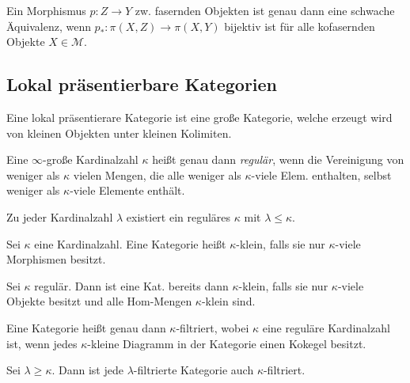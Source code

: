\documentclass{cheat-sheet}
\newcommand{\ModC}{\mathcal{M}} %
\begin{document}
\begin{thm}
  Ein Morphismus $p : Z \to Y$ zw. fasernden Objekten ist genau dann eine schwache Äquivalenz, wenn $p_* : \pi(X, Z) \to \pi(X, Y)$ bijektiv ist für alle kofasernden Objekte $X \in \ModC$.
\end{thm}

\subsection{Lokal präsentierbare Kategorien}


\begin{motto}
  Eine lokal präsentierare Kategorie ist eine große Kategorie, welche erzeugt wird von kleinen Objekten unter kleinen Kolimiten.
\end{motto}

\begin{defn}
  Eine $\infty$-große Kardinalzahl $\kappa$ heißt genau dann \emph{regulär}, wenn die Vereinigung von weniger als $\kappa$ vielen Mengen, die alle weniger als $\kappa$-viele Elem. enthalten, selbst weniger als $\kappa$-viele Elemente enthält.
\end{defn}

\begin{bem}
  Zu jeder Kardinalzahl $\lambda$ existiert ein reguläres $\kappa$ mit $\lambda \leq \kappa$.
\end{bem}

\begin{defn}
  Sei $\kappa$ eine Kardinalzahl. Eine Kategorie heißt $\kappa$-klein, falls sie nur $\kappa$-viele Morphismen besitzt.
\end{defn}

\begin{bem}
  Sei $\kappa$ regulär. Dann ist eine Kat. bereits dann $\kappa$-klein, falls sie nur $\kappa$-viele Objekte besitzt und alle Hom-Mengen $\kappa$-klein sind.
\end{bem}

\begin{defn}
  Eine Kategorie heißt genau dann $\kappa$-filtriert, wobei $\kappa$ eine reguläre Kardinalzahl ist, wenn jedes $\kappa$-kleine Diagramm in der Kategorie einen Kokegel besitzt.
\end{defn}

\begin{bem}
  Sei $\lambda \geq \kappa$. Dann ist jede $\lambda$-filtrierte Kategorie auch $\kappa$-filtriert.
\end{bem}
\end{document}
